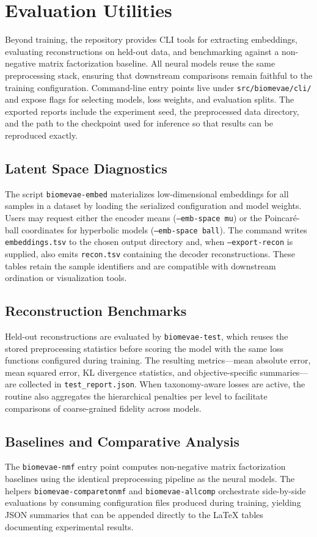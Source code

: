 \documentclass[11pt]{article}
\begin{document}
\section{Evaluation Utilities}
Beyond training, the repository provides CLI tools for extracting embeddings,
evaluating reconstructions on held-out data, and benchmarking against a
non-negative matrix factorization baseline. All neural models reuse the same
preprocessing stack, ensuring that downstream comparisons remain faithful to the
training configuration. Command-line entry points live under
\texttt{src/biomevae/cli/} and expose flags for selecting models, loss weights, and
evaluation splits. The exported reports include the experiment seed, the
preprocessed data directory, and the path to the checkpoint used for inference so
that results can be reproduced exactly.

\subsection{Latent Space Diagnostics}
The script \texttt{biomevae-embed} materializes low-dimensional embeddings for all
samples in a dataset by loading the serialized configuration and model weights.
Users may request either the encoder means (\texttt{--emb-space mu}) or the
Poincar\'e-ball coordinates for hyperbolic models (\texttt{--emb-space ball}).
The command writes \texttt{embeddings.tsv} to the chosen output directory and,
when \texttt{--export-recon} is supplied, also emits \texttt{recon.tsv} containing
the decoder reconstructions. These tables retain the sample identifiers and are
compatible with downstream ordination or visualization tools.

\subsection{Reconstruction Benchmarks}
Held-out reconstructions are evaluated by \texttt{biomevae-test}, which reuses the
stored preprocessing statistics before scoring the model with the same loss
functions configured during training. The resulting metrics---mean absolute
error, mean squared error, KL divergence statistics, and objective-specific
summaries---are collected in \texttt{test\_report.json}. When taxonomy-aware losses
are active, the routine also aggregates the hierarchical penalties per level to
facilitate comparisons of coarse-grained fidelity across models.

\subsection{Baselines and Comparative Analysis}
The \texttt{biomevae-nmf} entry point computes non-negative matrix factorization
baselines using the identical preprocessing pipeline as the neural models. The
helpers \texttt{biomevae-comparetonmf} and \texttt{biomevae-allcomp} orchestrate
side-by-side evaluations by consuming configuration files produced during
training, yielding JSON summaries that can be appended directly to the LaTeX
tables documenting experimental results.
\end{document}
